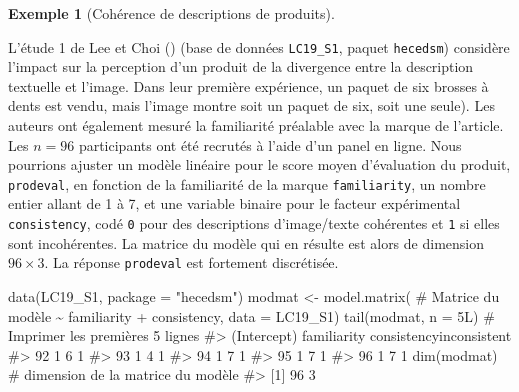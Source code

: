 \documentclass[
  11pt,
  letterpaper,
]{scrbook}
\newenvironment{Shaded}{\begin{snugshade}}{\end{snugshade}}
\newcommand{\AttributeTok}[1]{\textcolor[rgb]{0.40,0.45,0.13}{#1}}
\newcommand{\CommentTok}[1]{\textcolor[rgb]{0.37,0.37,0.37}{#1}}
\newcommand{\DecValTok}[1]{\textcolor[rgb]{0.68,0.00,0.00}{#1}}
\newcommand{\FunctionTok}[1]{\textcolor[rgb]{0.28,0.35,0.67}{#1}}
\newcommand{\NormalTok}[1]{\textcolor[rgb]{0.00,0.23,0.31}{#1}}
\newcommand{\OtherTok}[1]{\textcolor[rgb]{0.00,0.23,0.31}{#1}}
\newcommand{\SpecialCharTok}[1]{\textcolor[rgb]{0.37,0.37,0.37}{#1}}
\newcommand{\StringTok}[1]{\textcolor[rgb]{0.13,0.47,0.30}{#1}}
\theoremstyle{definition}
\theoremstyle{plain}
\theoremstyle{definition}
\newtheorem{example}{Exemple}[chapter]
\theoremstyle{plain}
\theoremstyle{remark}
\begin{document}
\begin{example}[Cohérence de descriptions de
produits]\protect\hypertarget{exm-lee-choi1}{}\label{exm-lee-choi1}

L'étude 1 de Lee et Choi () (base de
données \texttt{LC19\_S1}, paquet \texttt{hecedsm}) considère l'impact
sur la perception d'un produit de la divergence entre la description
textuelle et l'image. Dans leur première expérience, un paquet de six
brosses à dents est vendu, mais l'image montre soit un paquet de six,
soit une seule). Les auteurs ont également mesuré la familiarité
préalable avec la marque de l'article. Les \(n=96\) participants ont été
recrutés à l'aide d'un panel en ligne. Nous pourrions ajuster un modèle
linéaire pour le score moyen d'évaluation du produit, \texttt{prodeval},
en fonction de la familiarité de la marque \texttt{familiarity}, un
nombre entier allant de 1 à 7, et une variable binaire pour le facteur
expérimental \texttt{consistency}, codé \texttt{0} pour des descriptions
d'image/texte cohérentes et \texttt{1} si elles sont incohérentes. La
matrice du modèle qui en résulte est alors de dimension \(96\times 3\).
La réponse \texttt{prodeval} est fortement discrétisée.

\begin{Shaded}
\begin{Highlighting}[]
\FunctionTok{data}\NormalTok{(LC19\_S1, }\AttributeTok{package =} \StringTok{"hecedsm"}\NormalTok{)}
\NormalTok{modmat }\OtherTok{\textless{}{-}} \FunctionTok{model.matrix}\NormalTok{( }\CommentTok{\# Matrice du modèle}
     \SpecialCharTok{\textasciitilde{}}\NormalTok{ familiarity }\SpecialCharTok{+}\NormalTok{ consistency,}
     \AttributeTok{data =}\NormalTok{ LC19\_S1)}
\FunctionTok{tail}\NormalTok{(modmat, }\AttributeTok{n =} \DecValTok{5}\NormalTok{L) }\CommentTok{\# Imprimer les premières 5 lignes}
\CommentTok{\#\textgreater{}    (Intercept) familiarity consistencyinconsistent}
\CommentTok{\#\textgreater{} 92           1           6                       1}
\CommentTok{\#\textgreater{} 93           1           4                       1}
\CommentTok{\#\textgreater{} 94           1           7                       1}
\CommentTok{\#\textgreater{} 95           1           7                       1}
\CommentTok{\#\textgreater{} 96           1           7                       1}
\FunctionTok{dim}\NormalTok{(modmat) }\CommentTok{\# dimension de la matrice du modèle}
\CommentTok{\#\textgreater{} [1] 96  3}
\end{Highlighting}
\end{Shaded}

\end{example}
\end{document}
